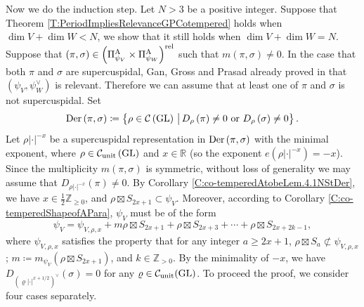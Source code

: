 \documentclass[11pt,letterpaper]{amsart}
\theoremstyle{plain}
\numberwithin{theorem}{section}
\numberwithin{equation}{subsection}
\theoremstyle{remark}
\newcommand{\GL}{\operatorname{GL}}
\newcommand{\Z}{\mathbb{Z}}
\newcommand{\R}{\mathbb{R}}
\newcommand{\unit}{{\rm unit}}
\def\calC{\mathcal{C}}
\def\AP{\Pi^{\rm A}} %
\def\rel{{\rm rel}} %
\def\Der{{\rm Der}} %
\begin{document}
Now we do the induction step. Let $N>3$ be a positive integer. Suppose that Theorem \ref{T:PeriodImpliesRelevanceGPCotempered} holds when $\dim V+\dim W<N$, we show that it still holds when $\dim V+\dim W=N$. Suppose that $\left(\pi,\sigma\right)\in\left(\AP_{{\psi_V}}\times \AP_{{\psi_W}}\right)^\rel$ such that $m\left(\pi,\sigma\right)\neq 0$. In the case that both $\pi$ and $\sigma$ are supercuspidal, Gan, Gross and Prasad already proved in \cite[Thm. 7.7]{MR4190046} that $\left(\psi_V,\psi_W^\vee\right)$ is relevant. Therefore we can assume that at least one of $\pi$ and $\sigma$ is not supercuspidal. Set
\[
    \Der\left(\pi,\sigma\right) \coloneqq \left\{\rho\in\calC\left(\GL\right)\,\big|\,D_\rho\left(\pi\right)\neq 0 \text{ or } D_\rho\left(\sigma\right) \neq 0\right\}.
\]
Let $\rho|\cdot|^{-x}$ be a supercuspidal representation in $\Der\left(\pi,\sigma\right)$ with the minimal exponent, where $\rho\in\calC_{\unit}\left(\GL\right)$ and $x\in\R$ (so the exponent $e\left(\rho|\cdot|^{-x}\right)=-x$). Since the multiplicity $m\left(\pi,\sigma\right)$ is symmetric, without loss of generality we may assume that $D_{\rho|\cdot|^{-x}}\left(\pi\right)\neq 0$. By Corollary \ref{C:co-temperedAtobeLem.4.1NStDer}, we have $x\in\frac{1}{2}\Z_{\geq 0}$, and $\rho\boxtimes S_{2x+1} \subset \psi_V$. Moreover, according to Corollary \ref{C:co-temperedShapeofAPara}, $\psi_V$ must be of the form 
\[
    \psi_V = \psi_{V,\rho,x} + m\rho \boxtimes S_{2x+1} + \rho\boxtimes S_{2x+3} + \cdots + \rho\boxtimes S_{2x+2k-1},
\]
where $\psi_{V,\rho,x}$ satisfies the property that for any integer $a\geq 2x+1$, $\rho\boxtimes S_a\not\subset \psi_{V,\rho,x}$; $m\coloneqq m_{\psi_V}\left(\rho\boxtimes S_{2x+1}\right)$, and $k\in\Z_{> 0}$. By the minimality of $-x$, we have $D_{\left(\varrho|\cdot|^{x+1/2}\right)^\vee}\left(\sigma\right)=0$ for any $\varrho\in\calC_{\unit}(\GL)$. To proceed the proof, we consider four cases separately.

\vskip 5pt
\end{document}
